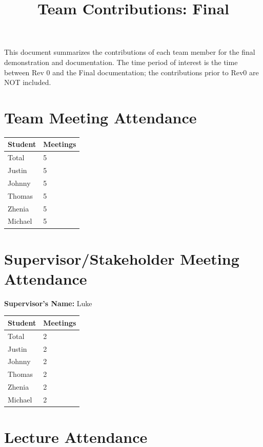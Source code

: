\documentclass{article}
\title{Team Contributions: Final\\\progname}
\author{\authname}
\date{}
\begin{document}
\maketitle

This document summarizes the contributions of each team member for the final
demonstration and documentation.  The time period of interest is the time
between Rev 0 and the Final documentation; the contributions prior to Rev0 are
NOT included.

\section{Team Meeting Attendance}

\begin{table}[H]
\centering
\begin{tabular}{ll}
\toprule
\textbf{Student} & \textbf{Meetings}\\
\midrule
Total & 5\\
Justin & 5\\
Johnny & 5\\
Thomas & 5\\
Zhenia & 5\\
Michael & 5\\
\bottomrule
\end{tabular}
\end{table}

\newpage

\section{Supervisor/Stakeholder Meeting Attendance}

\noindent \textbf{Supervisor's Name: } Luke

\begin{table}[H]
\centering
\begin{tabular}{ll}
\toprule
\textbf{Student} & \textbf{Meetings}\\
\midrule
Total & 2\\
Justin & 2\\
Johnny & 2\\
Thomas & 2\\
Zhenia & 2\\
Michael & 2\\
\bottomrule
\end{tabular}
\end{table}

\section{Lecture Attendance}
\end{document}
